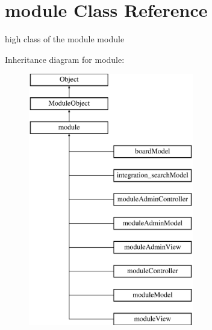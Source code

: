 \hypertarget{classmodule}{}\section{module Class Reference}
\label{classmodule}


high class of the module module  


Inheritance diagram for module\+:\begin{figure}[H]
\begin{center}
\leavevmode
\includegraphics[height=11.000000cm]{classmodule}
\end{center}
\end{figure}
